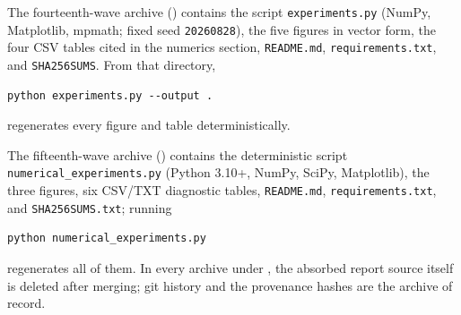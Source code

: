 \documentclass[11pt,oneside]{article}
\numberwithin{equation}{section}
\theoremstyle{definition}
\theoremstyle{remark}
\begin{document}
The fourteenth-wave archive
() contains the script
\texttt{experiments.py} (NumPy, Matplotlib, mpmath; fixed seed
\texttt{20260828}), the five figures in vector form, the four CSV tables
cited in the numerics section, \texttt{README.md}, \texttt{requirements.txt},
and \texttt{SHA256SUMS}.  From that directory,
\begin{lstlisting}[style=repoPython]
python experiments.py --output .
\end{lstlisting}
regenerates every figure and table deterministically.

The fifteenth-wave archive
() contains the deterministic
script \texttt{numerical\_experiments.py} (Python 3.10+, NumPy, SciPy,
Matplotlib), the three figures, six CSV/TXT diagnostic tables,
\texttt{README.md}, \texttt{requirements.txt}, and \texttt{SHA256SUMS.txt};
running
\begin{lstlisting}[style=repoPython]
python numerical_experiments.py
\end{lstlisting}
regenerates all of them.  In every archive under , the
absorbed report source itself is deleted after merging; git history and the
provenance hashes are the archive of record.
\end{document}
